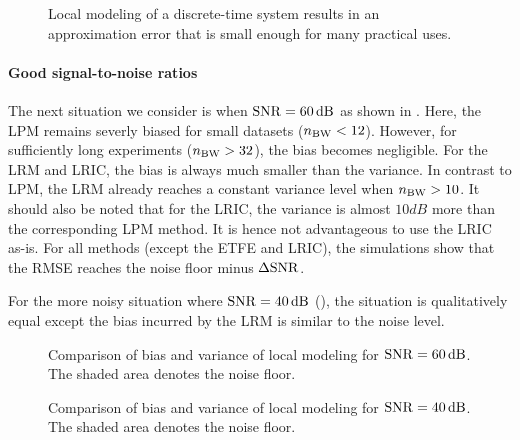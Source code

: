 \begin{figure}[htb]
  \centering
  \setlength{\figurewidth}{0.85\columnwidth}
  \setlength{\figureheight}{0.62\figurewidth}
  
  \caption[Comparison of local models for $\SNR = \infty$]{Local modeling of a discrete-time system results in an approximation error that is small enough for many practical uses. }
  \label{fig:nparam:comparison:noiseless}
\end{figure}

\paragraph{Good signal-to-noise ratios}
The next situation we consider is when $\SNR=60\unit{dB}$ as shown in .
Here, the \gls{LPM} remains severly biased for small datasets ($n_{\mathrm{BW}} < 12$).
However, for sufficiently long experiments ($n_{\mathrm{BW}} > 32$), the bias becomes negligible.
For the \gls{LRM} and \gls{LRIC}, the bias is always much smaller than the variance.
In contrast to \gls{LPM}, the \gls{LRM} already reaches a constant variance level when $n_{\mathrm{BW}} > 10$.
It should also be noted that for the \gls{LRIC}, the variance is almost $10\unit{dB}$ more than the corresponding \gls{LPM} method.
It is hence not advantageous to use the \gls{LRIC} as-is.
For all methods (except the \gls{ETFE} and \gls{LRIC}), the simulations show that the \gls{RMSE} reaches the noise floor minus $\Delta \mathrm{SNR}$.

For the more noisy situation where $\SNR = 40 \unit{dB}$ (), the situation is qualitatively equal except the bias incurred by the \gls{LRM} is similar to the noise level.

\begin{figure}[p]
  \centering
  \setlength{\figurewidth}{0.85\columnwidth}
  \setlength{\figureheight}{0.62\figurewidth}
  
  \caption[Comparison of local models for $\SNR = 60 \unit{dB}$]{Comparison of bias and variance of local modeling for $\SNR=60\unit{dB}$. The shaded area denotes the noise floor.}
  \label{fig:nparam:comparison:hiSNR}
\end{figure}

\begin{figure}[p]
  \centering
  \setlength{\figurewidth}{0.85\columnwidth}
  \setlength{\figureheight}{0.62\figurewidth}
  
  \caption[Comparison of local models for $\SNR = 40 \unit{dB}$]{Comparison of bias and variance of local modeling for $\SNR=40\unit{dB}$. The shaded area denotes the noise floor.}
  \label{fig:nparam:comparison:midSNR}
\end{figure}

